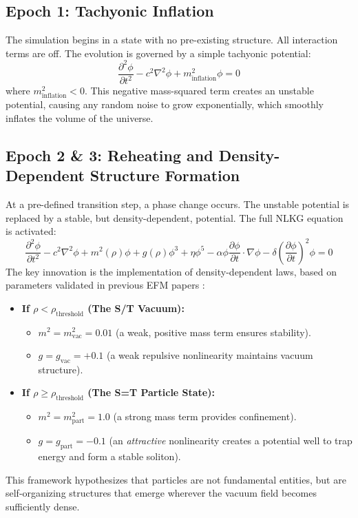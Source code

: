 \documentclass[11pt, twoside]{article}
\begin{document}
\subsection{Epoch 1: Tachyonic Inflation}
The simulation begins in a state with no pre-existing structure. All interaction terms are off. The evolution is governed by a simple tachyonic potential:
\begin{equation}
\frac{\partial^2\phi}{\partial t^2} - c^2\nabla^2\phi + m_{\text{inflation}}^2\phi = 0
\end{equation}
where \(m_{\text{inflation}}^2 < 0\). This negative mass-squared term creates an unstable potential, causing any random noise to grow exponentially, which smoothly inflates the volume of the universe.

\subsection{Epoch 2 \& 3: Reheating and Density-Dependent Structure Formation}
At a pre-defined transition step, a phase change occurs. The unstable potential is replaced by a stable, but density-dependent, potential. The full NLKG equation is activated:
\begin{equation}
\frac{\partial^2\phi}{\partial t^2} - c^2\nabla^2\phi + m^2(\rho)\phi + g(\rho)\phi^3 + \eta\phi^5 - \alpha\phi\frac{\partial\phi}{\partial t}\cdot\nabla\phi - \delta\left(\frac{\partial\phi}{\partial t}\right)^2\phi = 0
\end{equation}
The key innovation is the implementation of density-dependent laws, based on parameters validated in previous EFM papers \citep{EFMDimensionlessPaper, EFMmassgen}:
\begin{itemize}
    \item \textbf{If \(\rho < \rho_{\text{threshold}}\) (The S/T Vacuum):}
    \begin{itemize}
        \item \(m^2 = m_{\text{vac}}^2 = 0.01\) (a weak, positive mass term ensures stability).
        \item \(g = g_{\text{vac}} = +0.1\) (a weak repulsive nonlinearity maintains vacuum structure).
    \end{itemize}
    \item \textbf{If \(\rho \geq \rho_{\text{threshold}}\) (The S=T Particle State):}
    \begin{itemize}
        \item \(m^2 = m_{\text{part}}^2 = 1.0\) (a strong mass term provides confinement).
        \item \(g = g_{\text{part}} = -0.1\) (an \textit{attractive} nonlinearity creates a potential well to trap energy and form a stable soliton).
    \end{itemize}
\end{itemize}
This framework hypothesizes that particles are not fundamental entities, but are self-organizing structures that emerge wherever the vacuum field becomes sufficiently dense.
\end{document}
